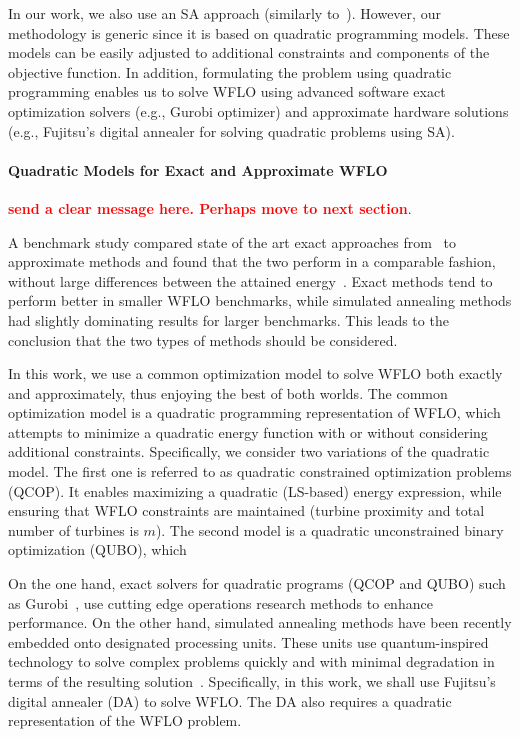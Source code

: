 \documentclass[preprint,12pt]{elsarticle}
\newcommand{\todo}[1]{{\textcolor{red}{\bf {#1}}}}
\begin{document}
In our work, we also use an SA approach (similarly to~\cite{rivas2009solving}). However,
our methodology is generic since it is based on quadratic programming models.
These models can be easily adjusted to additional constraints and components of the objective function. In addition, formulating the problem using quadratic programming  enables us to solve WFLO using advanced software exact optimization solvers (e.g., Gurobi optimizer) and approximate hardware solutions (e.g., Fujitsu's digital annealer for solving quadratic problems using SA). 




\paragraph{Quadratic Models for Exact and Approximate WFLO}
\todo{send a clear message here. Perhaps move to next section}.

A benchmark study compared state of the art exact approaches from~\cite{Zhang2014} to 
approximate methods and found that the two perform in a comparable fashion, without large differences between
the attained energy~\cite{yang2019simulated}. Exact methods tend to perform better
in smaller WFLO benchmarks, while simulated annealing methods had slightly dominating results
for larger benchmarks. This leads to the conclusion that the two types of methods should be considered. 


In this work, we use a common optimization model to solve WFLO both exactly and approximately, thus enjoying the  best of both worlds. 
The common optimization model is a quadratic programming representation of WFLO, 
which attempts to minimize a quadratic energy function with or without considering additional constraints.
Specifically, we consider two variations of the quadratic model. 
The first one is referred to as quadratic constrained optimization problems (QCOP). 
It enables maximizing a quadratic (LS-based) energy expression, while 
ensuring that WFLO constraints are maintained (turbine proximity and total number of turbines is $m$). 
The second model is a quadratic unconstrained binary optimization (QUBO), 
which 


On the one hand, exact solvers for quadratic programs (QCOP and QUBO) such as Gurobi~\cite{}, 
use cutting edge
operations research methods to enhance performance.
On the other hand, simulated annealing methods have been recently embedded onto 
designated processing units. These units use quantum-inspired technology to solve
complex problems quickly and with minimal degradation in terms of the resulting solution~\cite{}.
Specifically, in this work, we shall use Fujitsu's digital annealer (DA) to solve WFLO. The DA
also requires a quadratic representation of the WFLO problem. 
\end{document}
